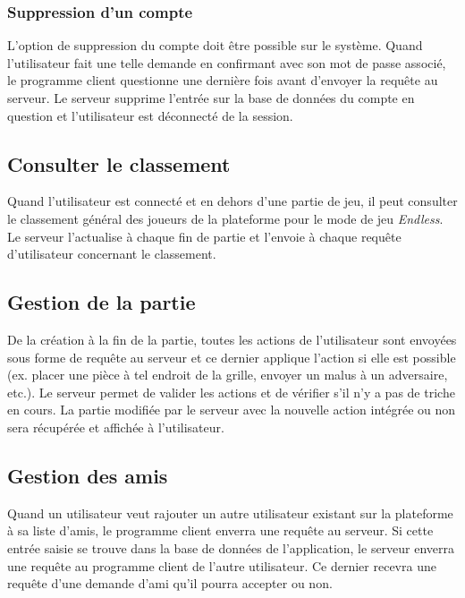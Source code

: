 \documentclass{article}
\begin{document}
\subsubsection{Suppression d'un compte}

L'option de suppression du compte doit être possible sur le système. Quand l'utilisateur fait une telle demande en confirmant avec son mot de passe associé, le programme client questionne une dernière fois avant d'envoyer la requête au serveur. Le serveur supprime l'entrée sur la base de données du compte en question et l'utilisateur est déconnecté de la session.

\subsection{Consulter le classement}

Quand l'utilisateur est connecté et en dehors d'une partie de jeu, il peut consulter le classement général des joueurs de la plateforme pour le mode de jeu \textit{Endless}. Le serveur l'actualise à chaque fin de partie et l'envoie à chaque requête d'utilisateur concernant le classement.

\subsection{Gestion de la partie}

De la création à la fin de la partie, toutes les actions de l'utilisateur sont envoyées sous forme de requête au serveur et ce dernier applique l'action si elle est possible (ex. placer une pièce à tel endroit de la grille, envoyer un malus à un adversaire, etc.). Le serveur permet de valider les actions et de vérifier s'il n'y a pas de triche en cours. La partie modifiée par le serveur avec la nouvelle action intégrée ou non sera récupérée et affichée à l'utilisateur.

\subsection{Gestion des amis}

Quand un utilisateur veut rajouter un autre utilisateur existant sur la plateforme à sa liste d'amis, le programme client enverra une requête au serveur. Si cette entrée saisie se trouve dans la base de données de l'application, le serveur enverra une requête au programme client de l'autre utilisateur. Ce dernier recevra une requête d'une demande d'ami qu'il pourra accepter ou non.
\end{document}
